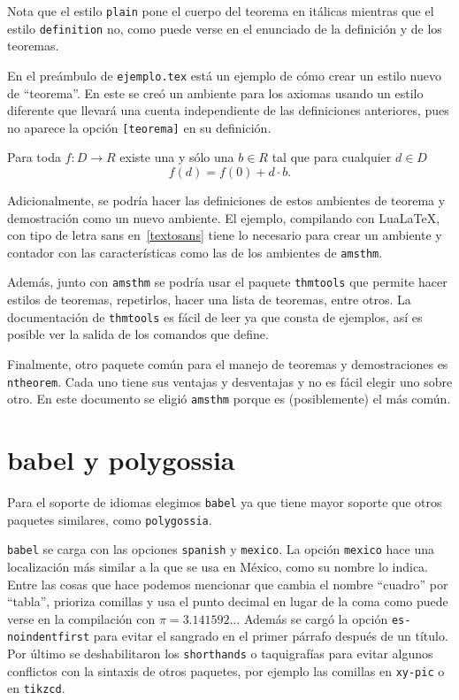 Nota que el estilo \texttt{plain} pone el cuerpo del teorema en itálicas
mientras que el estilo \texttt{definition} no, como puede verse en el
enunciado de la definición y de los teoremas.

En el preámbulo de \texttt{ejemplo.tex} está un ejemplo de cómo crear un
estilo nuevo de \enquote{teorema}. En este se creó un ambiente para los axiomas
usando un estilo diferente que llevará una cuenta independiente de las
definiciones anteriores, pues no aparece la opción \texttt{[teorema]} en su
definición.

\begin{axioma}
  Para toda \(f\colon D\to R\) existe una y sólo una \(b\in R\) tal que para
  cualquier \(d\in D\)
  \[
    f(d)=f(0)+d\cdot b.
  \]
\end{axioma}

Adicionalmente, se podría hacer las definiciones de estos ambientes de
teorema y demostración como un nuevo ambiente. El ejemplo, compilando con
Lua\LaTeX, con tipo de letra sans en~\ref{textosans} tiene lo necesario para
crear un ambiente y contador con las características como las de los
ambientes de \texttt{amsthm}.

Además, junto con \texttt{amsthm} se podría usar el paquete
\texttt{thmtools} que permite hacer estilos de teoremas, repetirlos, hacer
una lista de teoremas, entre otros. La documentación de \texttt{thmtools} es
fácil de leer ya que consta de ejemplos, así es posible ver la salida de los
comandos que define.

Finalmente, otro paquete común para el manejo de teoremas y demostraciones
es \texttt{ntheorem}. Cada uno tiene sus ventajas y desventajas y no es
fácil elegir uno sobre otro. En este documento se eligió \texttt{amsthm}
porque es (posiblemente) el más común.


\section{babel y polygossia}%
\label{sec:babel}
Para el soporte de idiomas elegimos \texttt{babel} ya que tiene mayor soporte que otros paquetes similares, como \texttt{polygossia}.

\texttt{babel} se carga con las opciones \texttt{spanish} y
\texttt{mexico}. La opción \texttt{mexico} hace una localización más similar
a la que se usa en México, como su nombre lo indica. Entre las cosas que
hace podemos mencionar que cambia el nombre \enquote{cuadro} por \enquote{tabla},
prioriza comillas y usa el punto decimal en lugar de la coma como puede
verse en la compilación con \(\pi=3.141592\ldots \) Además se
cargó la opción \texttt{es-noindentfirst} para evitar el sangrado en el
primer párrafo después de un título. Por
último se deshabilitaron los \texttt{shorthands} o taquigrafías para evitar
algunos conflictos con la sintaxis de otros paquetes, por ejemplo las
comillas en \texttt{xy-pic} o en \texttt{tikzcd}.

